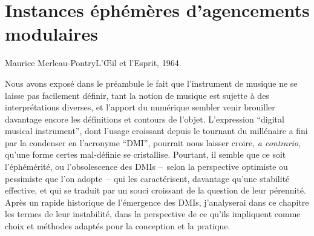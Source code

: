 %
\chapter{Instances éphémères d'agencements modulaires}
\label{ch:ephemeral}



{Maurice Merleau-Pontry}{L'Œil et l'Esprit, 1964.\\\cite{merleau-ponty_loeil_1964}} %


\vspace*{\fill}

\noindent Nous avons exposé dans le préambule le fait que l'instrument de musique ne se laisse pas facilement définir, tant la notion de musique est sujette à des interprétations diverses, et l'apport du numérique sembler venir brouiller davantage encore les définitions et contours de l'objet. L'expression ``digital musical instrument'', dont l'usage croissant depuis le tournant du millénaire a fini par la condenser en l'acronyme ``\gls{DMI}'', pourrait nous laisser croire, \textit{a contrario}, qu'une forme certes mal-définie se cristallise. Pourtant, il semble que ce soit l'éphémérité, ou l'obsolescence des \glspl{DMI} --~selon la perspective optimiste ou pessimiste que l'on adopte~-- qui les caractérisent, davantage qu'une stabilité effective, et qui se traduit par un souci croissant de la question de leur pérennité.\\
\indent Après un rapide historique de l'émergence des \glspl{DMI}, j'analyserai dans ce chapitre les termes de leur instabilité, dans la perspective de ce qu'ils impliquent comme choix et méthodes adaptés pour la conception et la pratique.

